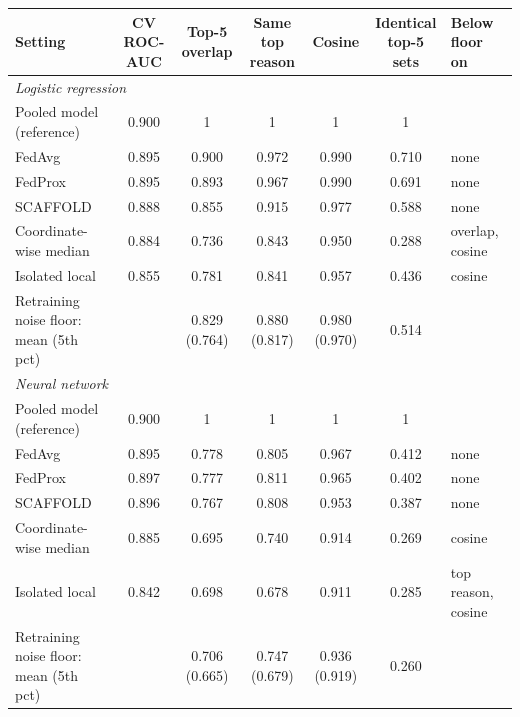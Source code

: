 \begin{tabular}{lcccccl}
\toprule
Setting & \makecell{CV\\ROC-AUC} & \makecell{Top-5\\overlap} & \makecell{Same top\\reason} & Cosine & \makecell{Identical\\top-5 sets} & \makecell{Below floor\\on} \\
\midrule
\multicolumn{7}{l}{\emph{Logistic regression}} \\
Pooled model (reference) & 0.900 & 1 & 1 & 1 & 1 & \\
FedAvg & 0.895 & 0.900 & 0.972 & 0.990 & 0.710 & none \\
FedProx & 0.895 & 0.893 & 0.967 & 0.990 & 0.691 & none \\
SCAFFOLD & 0.888 & 0.855 & 0.915 & 0.977 & 0.588 & none \\
Coordinate-wise median & 0.884 & 0.736 & 0.843 & 0.950 & 0.288 & overlap, cosine \\
Isolated local & 0.855 & 0.781 & 0.841 & 0.957 & 0.436 & cosine \\
Retraining noise floor: mean (5th pct) & & 0.829 (0.764) & 0.880 (0.817) & 0.980 (0.970) & 0.514 & \\
\midrule
\multicolumn{7}{l}{\emph{Neural network}} \\
Pooled model (reference) & 0.900 & 1 & 1 & 1 & 1 & \\
FedAvg & 0.895 & 0.778 & 0.805 & 0.967 & 0.412 & none \\
FedProx & 0.897 & 0.777 & 0.811 & 0.965 & 0.402 & none \\
SCAFFOLD & 0.896 & 0.767 & 0.808 & 0.953 & 0.387 & none \\
Coordinate-wise median & 0.885 & 0.695 & 0.740 & 0.914 & 0.269 & cosine \\
Isolated local & 0.842 & 0.698 & 0.678 & 0.911 & 0.285 & top reason, cosine \\
Retraining noise floor: mean (5th pct) & & 0.706 (0.665) & 0.747 (0.679) & 0.936 (0.919) & 0.260 & \\
\bottomrule
\end{tabular}
